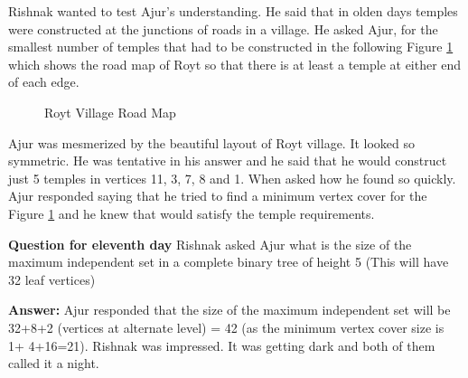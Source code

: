 Rishnak wanted to test Ajur's understanding. He said that in olden days temples were constructed at the junctions of roads in a village. He asked Ajur, for the smallest number of temples that had to be constructed in the following Figure \ref{13g6} which shows the road map of Royt so that there is at least a temple at either end of each edge.
\begin{figure}
\begin{center}

\caption{ Royt Village Road Map}\label{13g6}
\end{center}
\end{figure}

Ajur was mesmerized by the beautiful layout of Royt village. It looked so symmetric. He was tentative in his answer and he said that he would construct just 5 temples in vertices 11, 3, 7, 8 and 1.   When asked how he found so quickly. Ajur responded saying that he tried to find a minimum vertex cover for the Figure \ref{13g6} and he knew that would satisfy the temple requirements.

\textbf{Question for eleventh day} Rishnak asked Ajur what is the size of the maximum independent set in a complete binary tree of height 5 (This will have 32 leaf vertices)

\textbf{Answer:} Ajur responded that the size of the maximum independent set will be 32+8+2 (vertices at alternate level) = 42 (as the minimum vertex cover size is 1+ 4+16=21).
Rishnak was impressed. It was getting dark and both of them called it a night.
